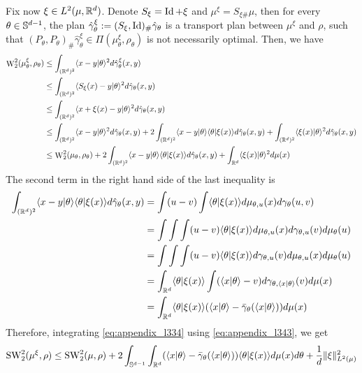 Fix now $\xi \in L^2(\mu,\mathbb R^d)$. Denote $S_\xi = \mathop{\mathrm{Id}}\nolimits + \xi$ and $\mu^\xi = S_{\xi\#} \mu$, then for every $\theta \in \mathbb S^{d-1}$, the plan $\hat{\gamma}_\theta^\xi := (S_\xi,\mathop{\mathrm{Id}}\nolimits)_\#\hat{\gamma}_\theta$ is a transport plan between $\mu^\xi$ and $\rho$, such that $(P_\theta,P_\theta)_{\#}\hat{\gamma}_\theta^\xi \in \Pi(\mu^\xi_\theta,\rho_\theta)$ is not necessarily optimal. Then, we have
\begin{align}
    \mathop{\mathrm{W}}\nolimits^2_2(\mu_\theta^\xi,\rho_\theta) &\leq \int_{(\mathbb R^d)^2} \langle x - y|\theta\rangle^2 d\hat{\gamma}_\theta^\xi(x,y) \notag \\
    &\leq \int_{(\mathbb R^d)^2} \langle S_\xi(x) - y|\theta\rangle^2 d\hat{\gamma}_\theta(x,y) \notag \\
    &\leq \int_{(\mathbb R^d)^2} \langle x + \xi(x) - y|\theta\rangle^2 d\hat{\gamma}_\theta(x,y) \notag \\
    &\leq \int_{(\mathbb R^d)^2} \langle x - y|\theta\rangle^2 d\hat{\gamma}_\theta(x,y) + 2\int_{(\mathbb R^d)^2} \langle x-y|\theta\rangle\langle\theta|\xi(x)\rangle d\hat{\gamma}_\theta(x,y) + \int_{(\mathbb R^d)^2} \langle\xi(x)|\theta\rangle^2 d\hat{\gamma}_\theta(x,y) \notag \\
    &\leq \mathop{\mathrm{W}}\nolimits_2^2(\mu_\theta,\rho_\theta) + 2\int_{(\mathbb R^d)^2} \langle x-y|\theta\rangle\langle\theta|\xi(x)\rangle d\hat{\gamma}_\theta(x,y) + \int_{\mathbb R^d} \langle\xi(x)|\theta\rangle^2 d\mu(x) \label{eq:appendix_l334}
\end{align}
The second term in the right hand side of the last inequality is
\begin{align}
    \int_{(\mathbb R^d)^2} \langle x-y|\theta\rangle\langle\theta|\xi(x)\rangle d\hat{\gamma}_\theta(x,y) 
    &= \int (u-v) \int \langle\theta|\xi(x)\rangle d\mu_{\theta,u}(x) d\gamma_\theta(u,v) \notag \\
    &= \int \int \int (u-v)\langle\theta|\xi(x)\rangle d\mu_{\theta,u}(x) d\gamma_{\theta,u}(v) d\mu_\theta(u) \notag \\
    &= \int \int \int (u-v)\langle\theta|\xi(x)\rangle d\gamma_{\theta,u}(v) d\mu_{\theta,u}(x) d\mu_\theta(u) \notag \\
    &= \int_{\mathbb R^d} \langle\theta|\xi(x)\rangle \int (\langle x|\theta\rangle - v)  d\gamma_{\theta,\langle x|\theta\rangle}(v) d\mu(x) \notag \\
    &= \int_{\mathbb R^d} \langle\theta|\xi(x)\rangle (\langle x|\theta\rangle - \bar{\gamma}_\theta(\langle x|\theta\rangle)) d\mu(x) \label{eq:appendix_l343}
\end{align}
Therefore, integrating \eqref{eq:appendix_l334} using \eqref{eq:appendix_l343}, we get
\begin{equation} \label{eq:appendix_l346}
    \mathop{\mathrm{SW}}\nolimits^2_2(\mu^\xi,\rho) \leq \mathop{\mathrm{SW}}\nolimits^2_2(\mu,\rho) + 2\int_{\mathbb S^{d-1}} \int_{\mathbb R^d} (\langle x|\theta\rangle - \bar{\gamma}_\theta(\langle x|\theta\rangle)) \langle\theta|\xi(x)\rangle d\mu(x) d\theta + \frac{1}{d} \|\xi\|^2_{L^2(\mu)}
\end{equation}
